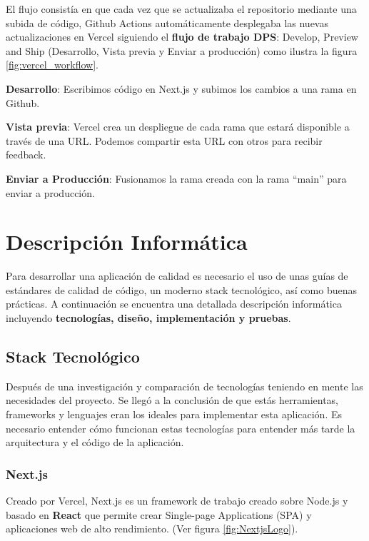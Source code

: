 \documentclass[12pt,twoside,titlepage]{report}
\begin{document}
El flujo consistía en que cada vez que se actualizaba el repositorio mediante una subida de código, Github Actions automáticamente desplegaba las nuevas actualizaciones en Vercel siguiendo el \textbf{flujo de trabajo DPS}: Develop, Preview and Ship (Desarrollo, Vista previa y Enviar a producción) como ilustra la figura \ref{fig:vercel_workflow}.

\begin{compactitem}
    \item \textbf{Desarrollo}: Escribimos código en Next.js y subimos los cambios a una rama en Github.
    \item \textbf{Vista previa}: Vercel crea un despliegue de cada rama que estará disponible a través de una URL. Podemos compartir esta URL con otros para recibir feedback. 
    \item \textbf{Enviar a Producción}: Fusionamos la rama creada con la rama ``main'' para enviar a producción.
\end{compactitem}


\chapter{Descripción Informática}

Para desarrollar una aplicación de calidad es necesario el uso de unas guías de estándares de calidad de código, un moderno stack tecnológico, así como buenas prácticas. A continuación se encuentra una detallada descripción informática incluyendo \textbf{tecnologías, diseño, implementación y pruebas}.

\section{Stack Tecnológico}

Después de una investigación y comparación de tecnologías teniendo en mente las necesidades del proyecto. Se llegó a la conclusión de que estás herramientas, frameworks y lenguajes eran los ideales para implementar esta aplicación. Es necesario entender cómo funcionan estas tecnologías para entender más tarde la arquitectura y el código de la aplicación.

\subsection{Next.js}

Creado por Vercel, Next.js es un framework de trabajo creado sobre Node.js y basado en \textbf{React} que permite crear Single-page Applications (SPA) y aplicaciones web de alto rendimiento.
(Ver figura \ref{fig:NextjsLogo}).
\end{document}
